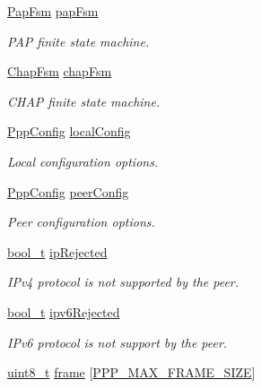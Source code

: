 \begin{DoxyCompactItemize}
\hyperlink{structPapFsm}{Pap\+Fsm} \hyperlink{struct__PppContext_a7472e352f3957bcd2bb8df3ef0ff1894}{pap\+Fsm}
\begin{DoxyCompactList}\small\item\em P\+AP finite state machine. \end{DoxyCompactList}\item 
\hyperlink{structChapFsm}{Chap\+Fsm} \hyperlink{struct__PppContext_a0beb2443b619ed307ed3c3f8ca634156}{chap\+Fsm}
\begin{DoxyCompactList}\small\item\em C\+H\+AP finite state machine. \end{DoxyCompactList}\item 
\hyperlink{structPppConfig}{Ppp\+Config} \hyperlink{struct__PppContext_a3aecec91eee70ae46ae0dc8b346a1d52}{local\+Config}
\begin{DoxyCompactList}\small\item\em Local configuration options. \end{DoxyCompactList}\item 
\hyperlink{structPppConfig}{Ppp\+Config} \hyperlink{struct__PppContext_a7441234f820bc1a2ab86d541ceddd84c}{peer\+Config}
\begin{DoxyCompactList}\small\item\em Peer configuration options. \end{DoxyCompactList}\item 
\hyperlink{compiler__port_8h_a812d16e5494522586b3784e55d479912}{bool\+\_\+t} \hyperlink{struct__PppContext_aabbbef89f6ce54f37a381d2bbcc51a1d}{ip\+Rejected}
\begin{DoxyCompactList}\small\item\em I\+Pv4 protocol is not supported by the peer. \end{DoxyCompactList}\item 
\hyperlink{compiler__port_8h_a812d16e5494522586b3784e55d479912}{bool\+\_\+t} \hyperlink{struct__PppContext_a0b928522d498c99446a97801fe716346}{ipv6\+Rejected}
\begin{DoxyCompactList}\small\item\em I\+Pv6 protocol is not support by the peer. \end{DoxyCompactList}\item 
\hyperlink{stdint_8h_aba7bc1797add20fe3efdf37ced1182c5}{uint8\+\_\+t} \hyperlink{struct__PppContext_a1cf0d11471c0ecf43ad3a15a9bf48ddd}{frame} \mbox{[}\hyperlink{ppp_8h_a54f0a20e93fc9a0666001e044bbbcc15}{P\+P\+P\+\_\+\+M\+A\+X\+\_\+\+F\+R\+A\+M\+E\+\_\+\+S\+I\+ZE}\mbox{]}

\end{DoxyCompactItemize}
